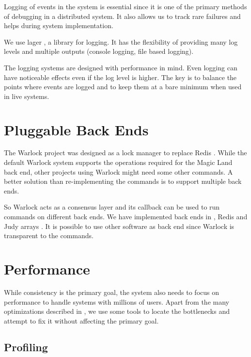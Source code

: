 Logging of events in the system is essential since it is one of the primary
methods of debugging in a distributed system. It also allows us to track rare
failures and helps during system implementation.

We use lager \citep{lager}, a library for logging. It has the flexibility of
providing many log levels%
and multiple outputs (console logging, file based logging).

The logging systems are designed with performance in mind. Even logging can have
noticeable effects even if the log level is higher. The key is to balance the
points where events are logged and to keep them at a bare minimum when used in
live systems.

\section{Pluggable Back Ends}

The Warlock project was designed as a lock manager to replace Redis
\citep{redis}. While the default Warlock system supports the operations
required for the Magic Land back end, other projects using Warlock might need
some other commands. A better solution than re-implementing the commands is to
support multiple back ends.

So Warlock acts as a consensus layer and its callback can be used to run
commands on different back ends. We have implemented back ends in ,
Redis and Judy arrays \citep{judy}. It is possible to use other software
as back end since Warlock is transparent to the commands.

\section{Performance}

While consistency is the primary goal, the system also needs to focus on performance
to handle systems with millions of users. Apart from the many optimizations
described in , we use some tools to locate
the bottlenecks and attempt to fix it without affecting the primary goal.

\subsection{Profiling}
\label{section:impl.profiling}

